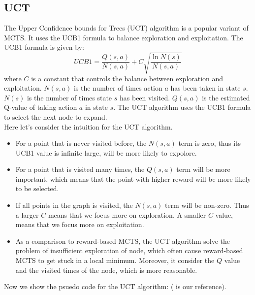 \documentclass[11pt]{article}
\begin{document}
\subsection{UCT}
The Upper Confidence bounds for Trees (UCT) algorithm \cite{UCT} is a popular variant of MCTS. It uses the UCB1 formula to balance exploration and exploitation. The UCB1 formula is given by:
\[
    UCB1 = \frac{Q(s,a)}{N(s,a)} + C \sqrt{\frac{\ln N(s)}{N(s,a)}}
\]
where \(C\) is a constant that controls the balance between exploration and exploitation. $N(s,a)$ is the number of times action $a$ has been taken in state $s$. $N(s)$ is the number of times state $s$ has been visited. \(Q(s,a)\) is the estimated Q-value of taking action \(a\) in state \(s\). The UCT algorithm uses the UCB1 formula to select the next node to expand.\\
Here let's consider the intuition for the UCT algorithm.\\
\begin{itemize}
    \item For a point that is never visited before, the $N(s,a)$ term is zero, thus its UCB1 value is infinite large, will be more likely to expolore.
    \item For a point that is visited many times, the $Q(s,a)$ term will be more important, which means that the point with higher reward will be more likely to be selected.
    \item If all points in the graph is visited, the $N(s,a)$ term will be non-zero. Thus a larger $C$ means that we focus more on exploration. A smaller $C$ value, means that we focus more on exploitation.
    \item As a comparison to reward-based MCTS, the UCT algorithm solve the problem of insufficient exploration of node, which often cause reward-based MCTS to get stuck in a local minimum. Moreover, it consider the $Q$ value and the visited times of the node, which is more reasonable.
\end{itemize}
Now we show the psuedo code for the UCT algorithm: (\cite{MCTSsurvey} is our reference).
\end{document}
